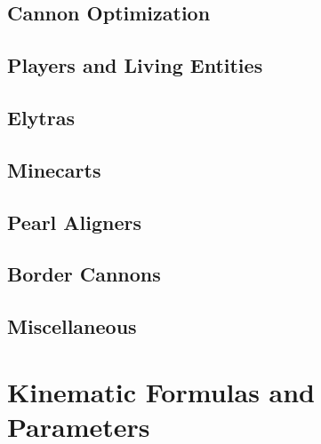 \documentclass{book}
\theoremstyle{definition}\newtheorem{mechanism}{Mechanism}
\theoremstyle{remark}\newtheorem*{remark}{Remark}
\begin{document}
\section{Cannon Optimization}


\section{Players and Living Entities}


\section{Elytras}


\section{Minecarts}


\section{Pearl Aligners}


\section{Border Cannons}


\section{Miscellaneous}



\appendix

\chapter{Kinematic Formulas and Parameters}
\end{document}

